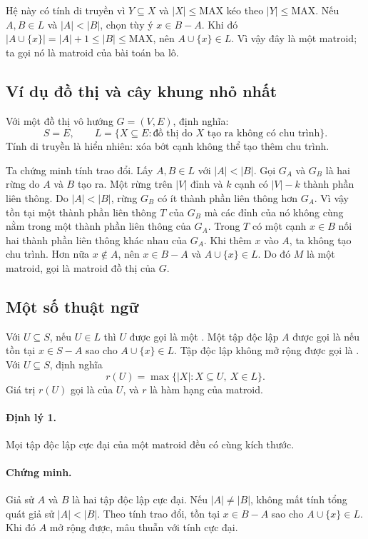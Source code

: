 \documentclass[11pt]{article}
\begin{document}
Hệ này có tính di truyền vì \(Y\subseteq X\) và \(|X|\le\mathrm{MAX}\) kéo theo
\(|Y|\le\mathrm{MAX}\). Nếu \(A,B\in L\) và \(|A|<|B|\), chọn tùy ý
\(x\in B-A\). Khi đó \(|A\cup\{x\}|=|A|+1\le |B|\le \mathrm{MAX}\), nên
\(A\cup\{x\}\in L\). Vì vậy đây là một matroid; ta gọi nó là matroid của bài
toán ba lô.

\subsection*{Ví dụ đồ thị và cây khung nhỏ nhất}

Với một đồ thị vô hướng \(G=(V,E)\), định nghĩa:
\[
  S=E,\qquad L=\{X\subseteq E: \text{đồ thị do } X \text{ tạo ra không có chu trình}\}.
\]
Tính di truyền là hiển nhiên: xóa bớt cạnh không thể tạo thêm chu trình.

Ta chứng minh tính trao đổi. Lấy \(A,B\in L\) với \(|A|<|B|\). Gọi \(G_A\) và
\(G_B\) là hai rừng do \(A\) và \(B\) tạo ra. Một rừng trên \(|V|\) đỉnh và
\(k\) cạnh có \(|V|-k\) thành phần liên thông. Do \(|A|<|B|\), rừng \(G_B\) có
ít thành phần liên thông hơn \(G_A\). Vì vậy tồn tại một thành phần liên thông
\(T\) của \(G_B\) mà các đỉnh của nó không cùng nằm trong một thành phần liên
thông của \(G_A\). Trong \(T\) có một cạnh \(x\in B\) nối hai thành phần liên
thông khác nhau của \(G_A\). Khi thêm \(x\) vào \(A\), ta không tạo chu trình.
Hơn nữa \(x\notin A\), nên \(x\in B-A\) và \(A\cup\{x\}\in L\). Do đó \(M\) là
một matroid, gọi là matroid đồ thị của \(G\).

\subsection*{Một số thuật ngữ}

Với \(U\subseteq S\), nếu \(U\in L\) thì \(U\) được gọi là một .
Một tập độc lập \(A\) được gọi là  nếu tồn tại
\(x\in S-A\) sao cho \(A\cup\{x\}\in L\). Tập độc lập không mở rộng được gọi là
. Với \(U\subseteq S\), định nghĩa
\[
  r(U)=\max\{|X|: X\subseteq U,\ X\in L\}.
\]
Giá trị \(r(U)\) gọi là  của \(U\), và \(r\) là hàm hạng của
matroid.

\paragraph{Định lý 1.}
Mọi tập độc lập cực đại của một matroid đều có cùng kích thước.

\paragraph{Chứng minh.}
Giả sử \(A\) và \(B\) là hai tập độc lập cực đại. Nếu \(|A|\ne |B|\), không mất
tính tổng quát giả sử \(|A|<|B|\). Theo tính trao đổi, tồn tại \(x\in B-A\) sao
cho \(A\cup\{x\}\in L\). Khi đó \(A\) mở rộng được, mâu thuẫn với tính cực đại.
\end{document}
